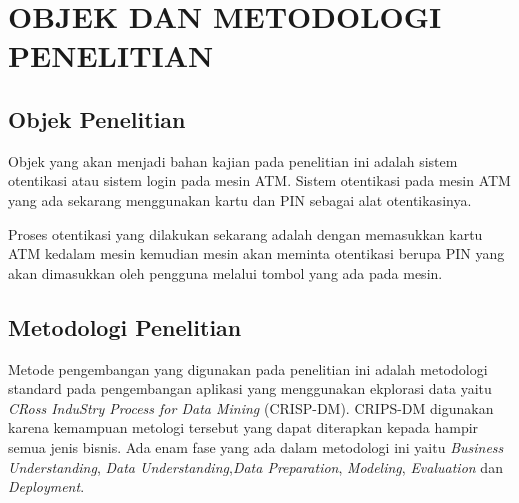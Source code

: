 \chapter{OBJEK DAN METODOLOGI PENELITIAN}

\section{Objek Penelitian}

Objek yang akan menjadi bahan kajian pada penelitian ini adalah sistem otentikasi atau sistem login pada mesin ATM. Sistem otentikasi pada mesin ATM yang ada sekarang menggunakan kartu dan PIN sebagai alat otentikasinya.

Proses otentikasi yang dilakukan sekarang adalah dengan memasukkan kartu ATM kedalam mesin kemudian mesin akan meminta otentikasi berupa PIN yang akan dimasukkan oleh pengguna melalui tombol yang ada pada mesin.


\section{Metodologi Penelitian}

Metode pengembangan yang digunakan pada penelitian ini adalah metodologi standard pada pengembangan aplikasi yang menggunakan ekplorasi data yaitu \textit{CRoss InduStry Process for Data Mining} (CRISP-DM). CRIPS-DM digunakan karena kemampuan metologi tersebut yang dapat diterapkan kepada hampir semua jenis bisnis. Ada enam fase yang ada dalam metodologi ini yaitu \textit{Business Understanding}, \textit{Data Understanding},\textit{Data Preparation}, \textit{Modeling}, \textit{Evaluation} dan \textit{Deployment}.

